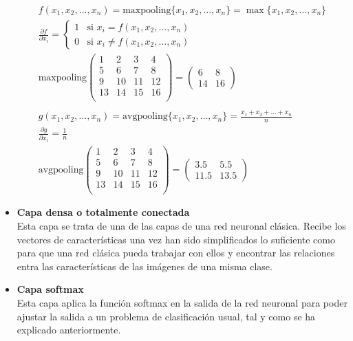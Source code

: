 \begin{itemize}
				$$
				\begin{gathered}
					f(x_1, x_2, \hdots, x_n) = \text{maxpooling}\{x_1, x_2, \hdots, x_n\} = \max\{x_1, x_2, \hdots, x_n\}\\
					\frac{\partial f}{\partial x_i} = \begin{cases}
						1 & \text{si } x_i = f(x_1, x_2, \hdots, x_n)\\
						0 & \text{si } x_i \neq f(x_1, x_2, \hdots, x_n)
					\end{cases}\\
					\text{maxpooling}\left(\begin{array}{cc|cc}
						1 & 2 & 3 & 4\\
						5 & \boxed{6} & 7 & \boxed{8}\\\hline
						9 & 10 & 11 & 12\\
						13 & \boxed{14} & 15 & \boxed{16}\\
					\end{array}\right) = \begin{pmatrix}
						6 & 8\\
						14 & 16
					\end{pmatrix}\\\\
					g(x_1, x_2, \hdots, x_n) = \text{avgpooling}\{x_1, x_2, \hdots, x_n\} = \frac{x_1 + x_2 + \hdots + x_n}{n}\\
					\frac{\partial g}{\partial x_i} = \frac{1}{n}\\
					\text{avgpooling}\left(\begin{array}{cc|cc}
						1 & 2 & 3 & 4\\
						5 & 6 & 7 & 8\\\hline
						9 & 10 & 11 & 12\\
						13 & 14 & 15 & 16\\
					\end{array}\right) = \begin{pmatrix}
						3.5 & 5.5\\
						11.5 & 13.5
					\end{pmatrix}
				\end{gathered}
				$$
				
				\item \textbf{Capa densa o totalmente conectada}\\
				Esta capa se trata de una de las capas de una red neuronal clásica. Recibe los vectores de características una vez han sido simplificados lo suficiente como para que una red clásica pueda trabajar con ellos y encontrar las relaciones entra las características de las imágenes de una misma clase. 
				
				\item \textbf{Capa softmax}\\
				Esta capa aplica la función softmax en la salida de la red neuronal para poder ajustar la salida a un problema de clasificación usual, tal y como se ha explicado anteriormente. 
			\end{itemize}
			
